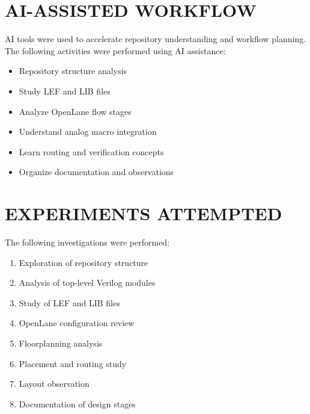 \documentclass[conference]{IEEEtran}
\begin{document}
\section{\MakeUppercase{AI-Assisted Workflow}}

{\fontsize{9.7}{15}\selectfont AI tools were used to accelerate repository understanding and workflow planning. The following activities were performed using AI assistance:}

\begin{itemize}
\item {\fontsize{9.7}{15}\selectfont Repository structure analysis}
\item {\fontsize{9.7}{15}\selectfont Study LEF and LIB files}
\item {\fontsize{9.7}{15}\selectfont Analyze OpenLane flow stages}
\item {\fontsize{9.7}{15}\selectfont Understand analog macro integration}
\item {\fontsize{9.7}{15}\selectfont Learn routing and verification concepts}
\item {\fontsize{9.7}{15}\selectfont Organize documentation and observations}
\end{itemize}

\section{\MakeUppercase{Experiments Attempted}}

{\fontsize{9.7}{15}\selectfont The following investigations were performed:}

\begin{enumerate}
\item {\fontsize{9.7}{15}\selectfont Exploration of repository structure}
\item {\fontsize{9.7}{15}\selectfont Analysis of top-level Verilog modules}
\item {\fontsize{9.7}{15}\selectfont Study of LEF and LIB files}
\item {\fontsize{9.7}{15}\selectfont OpenLane configuration review}
\item {\fontsize{9.7}{15}\selectfont Floorplanning analysis}
\item {\fontsize{9.7}{15}\selectfont Placement and routing study}
\item {\fontsize{9.7}{15}\selectfont Layout observation}
\item {\fontsize{9.7}{15}\selectfont Documentation of design stages}
\end{enumerate}
\end{document}
